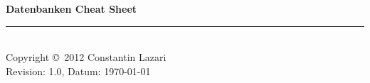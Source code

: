 \documentclass[10pt,landscape]{scrartcl}
\begin{document}
	\raggedright
	\footnotesize
	\begin{multicols}{3}


	\setlength{\premulticols}{1pt}
	\setlength{\postmulticols}{1pt}
	\setlength{\multicolsep}{1pt}
	\setlength{\columnsep}{2pt}
	\newlength{\MyLenA}
	\newlength{\MyLenB}

	\begin{center}
	\Large{\textbf{Datenbanken Cheat Sheet}} \\
	\end{center}

	
	
	
	
	
	
	
	
	
	
	
	
	
	
	
	
	\rule{0.3\linewidth}{0.25pt}\\
	\scriptsize
	Copyright \copyright\ 2012 Constantin Lazari\\
	Revision: 1.0, Datum: \today\\
	\end{multicols}
\end{document}
